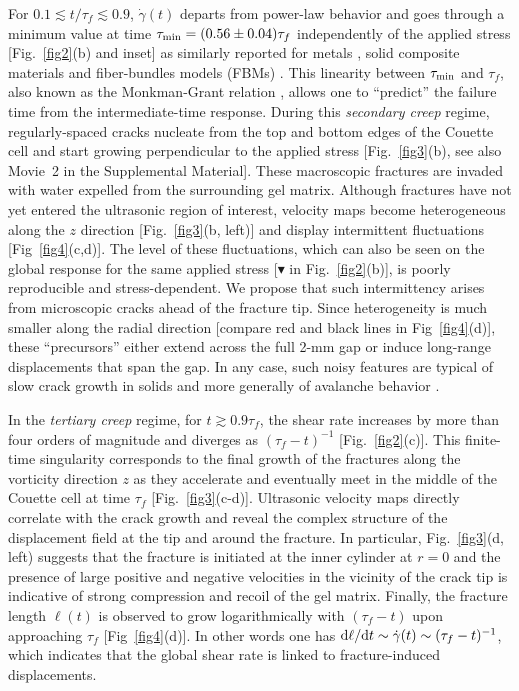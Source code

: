 \documentclass[twocolumn,superscriptaddress,showpacs,preprintnumbers,amsmath,amssymb,prl]{revtex4}
\newcommand\gp{\dot\gamma}
\begin{document}
For $0.1\lesssim t/\tau_f\lesssim 0.9$, $\gp(t)$ departs from power-law behavior and goes through a minimum value at time $\tau_{\rm min}= (0.56\pm0.04)\tau_f$ independently of the applied stress [Fig.~\ref{fig2}(b) and inset] as similarly reported for metals \cite{Sundararajan:1989}, solid composite materials \cite{Nechad:2005} and fiber-bundles models (FBMs) \cite{Kovacs:2008,Jagla:2011}. This linearity between $\tau_{\rm min}$ and $\tau_f$, also known as the Monkman-Grant relation \cite{Monkman:1956}, allows one to ``predict'' the failure time from the intermediate-time response. During this {\it secondary creep} regime, regularly-spaced cracks nucleate from the top and bottom edges of the Couette cell and start growing perpendicular to the applied stress [Fig.~\ref{fig3}(b), see also Movie~2 in the Supplemental Material]. These macroscopic fractures are invaded with water expelled from the surrounding gel matrix. Although fractures have not yet entered the ultrasonic region of interest, velocity maps become heterogeneous along the $z$ direction [Fig.~\ref{fig3}(b, left)] and display intermittent fluctuations [Fig~\ref{fig4}(c,d)]. The level of these fluctuations, which can also be seen on the global response for the same applied stress [\textcolor{red!50!black}{$\blacktriangledown$} in Fig.~\ref{fig2}(b)], is poorly reproducible and stress-dependent. We propose that such intermittency arises from microscopic cracks ahead of the fracture tip. Since heterogeneity is much smaller along the radial direction [compare red and black lines in Fig~\ref{fig4}(d)], these ``precursors'' either extend across the full 2-mm gap or induce long-range displacements that span the gap. In any case, such noisy features are typical of slow crack growth in solids \cite{Vanel:2009,Kun:2007} and more generally of avalanche behavior \cite{Sethna:2001}.

In the {\it tertiary creep} regime, for $t\gtrsim 0.9\tau_f$, the shear rate increases by more than four orders of magnitude and diverges as $(\tau_f-t)^{-1}$ [Fig.~\ref{fig2}(c)]. This finite-time singularity corresponds to the final growth of the fractures along the vorticity direction $z$ as they accelerate and eventually meet in the middle of the Couette cell at time $\tau_f$ [Fig.~\ref{fig3}(c-d)]. Ultrasonic velocity maps directly correlate with the crack growth and reveal the complex structure of the displacement field at the tip and around the fracture. In particular, Fig.~\ref{fig3}(d, left) suggests that the fracture is initiated at the inner cylinder at $r=0$ and the presence of large positive and negative velocities in the vicinity of the crack tip is indicative of strong compression and recoil of the gel matrix. Finally, the fracture length $\ell(t)$ is observed to grow logarithmically with $(\tau_f-t)$ upon approaching $\tau_f$ [Fig~\ref{fig4}(d)]. In other words one has ${\rm d}\ell/{\rm d}t\sim\gp(t)\sim (\tau_f-t)^{-1}$, which indicates that the global shear rate is linked to fracture-induced displacements.
\end{document}

